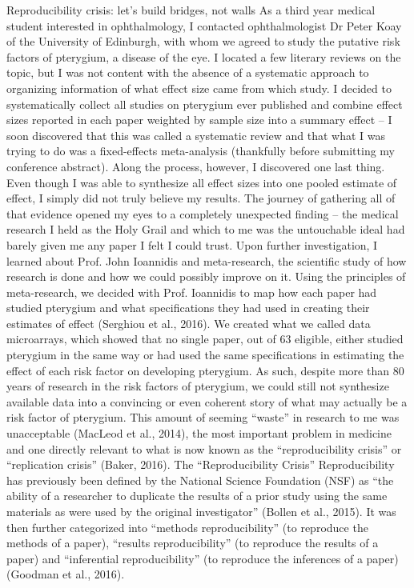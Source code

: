 \documentclass[12pt]{article}
\begin{document}
 
 
Reproducibility crisis: let’s build bridges, not walls
As a third year medical student interested in ophthalmology, I contacted ophthalmologist Dr Peter Koay of the University of Edinburgh, with whom we agreed to study the putative risk factors of pterygium, a disease of the eye. I located a few literary reviews on the topic, but I was not content with the absence of a systematic approach to organizing information of what effect size came from which study. I decided to systematically collect all studies on pterygium ever published and combine effect sizes reported in each paper weighted by sample size into a summary effect – I soon discovered that this was called a systematic review and that what I was trying to do was a fixed-effects meta-analysis (thankfully before submitting my conference abstract). Along the process, however, I discovered one last thing.
Even though I was able to synthesize all effect sizes into one pooled estimate of effect, I simply did not truly believe my results. The journey of gathering all of that evidence opened my eyes to a completely unexpected finding – the medical research I held as the Holy Grail and which to me was the untouchable ideal had barely given me any paper I felt I could trust. Upon further investigation, I learned about Prof. John Ioannidis and meta-research, the scientific study of how research is done and how we could possibly improve on it.
Using the principles of meta-research, we decided with Prof. Ioannidis to map how each paper had  studied pterygium and what specifications they had used in creating their estimates of effect (Serghiou et al., 2016). We created what we called data microarrays, which showed that no single paper, out of 63 eligible, either studied pterygium in the same way or had used the same specifications in estimating the effect of each risk factor on developing pterygium. As such, despite more than 80 years of research in the risk factors of pterygium, we could still not synthesize available data into a convincing or even coherent story of what may actually be a risk factor of pterygium. This amount of seeming “waste” in research to me was unacceptable (MacLeod et al., 2014), the most important problem in medicine and one directly relevant to what is now known as the “reproducibility crisis” or “replication crisis” (Baker, 2016).
The “Reproducibility Crisis”
Reproducibility has previously been defined by the National Science Foundation (NSF) as “the ability of a researcher to duplicate the results of a prior study using the same materials as were used by the original investigator” (Bollen et al., 2015). It was then further categorized into “methods reproducibility” (to reproduce the methods of a paper), “results reproducibility” (to reproduce the results of a paper) and “inferential reproducibility” (to reproduce the inferences of a paper) (Goodman et al., 2016). 
\end{document}
